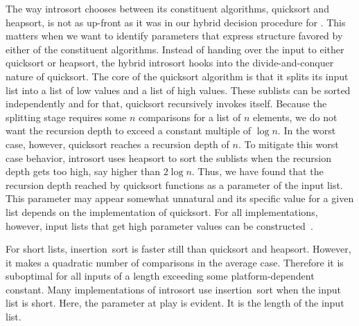 \begin{example}
  The way introsort chooses between its constituent algorithms, quicksort and heapsort, is not as up-front as it was in our hybrid decision procedure for .
  This matters when we want to identify parameters that express structure favored by either of the constituent algorithms.
  Instead of handing over the input to either quicksort or heapsort, the hybrid introsort hooks into the divide-and-conquer nature of quicksort.
  The core of the quicksort algorithm is that it splits its input list into a list of low values and a list of high values.
  These sublists can be sorted independently and for that, quicksort recursively invokes itself.
  Because the splitting stage requires some $n$ comparisons for a list of $n$ elements, we do not want the recursion depth to exceed a constant multiple of $\log n$.
  In the worst case, however, quicksort reaches a recursion depth of $n$.
  To mitigate this worst case behavior, introsort uses heapsort to sort the sublists when the recursion depth gets too high, say higher than $2 \log n$.
  Thus, we have found that the recursion depth reached by quicksort functions as a parameter of the input list.
  This parameter may appear somewhat unnatural and its specific value for a given list depends on the implementation of quicksort.
  For all implementations, however, input lists that get high parameter values can be constructed~\parencite{mcilroy1999killer}.

  For short lists, insertion~sort \parencite{cormen2009introduction} is faster still than quicksort and heapsort.
  However, it makes a quadratic number of comparisons in the average case.
  Therefore it is suboptimal for all inputs of a length exceeding some platform-dependent constant.
  Many implementations of introsort use insertion~sort when the input list is short.
  Here, the parameter at play is evident.
  It is the length of the input list.


\end{example}

